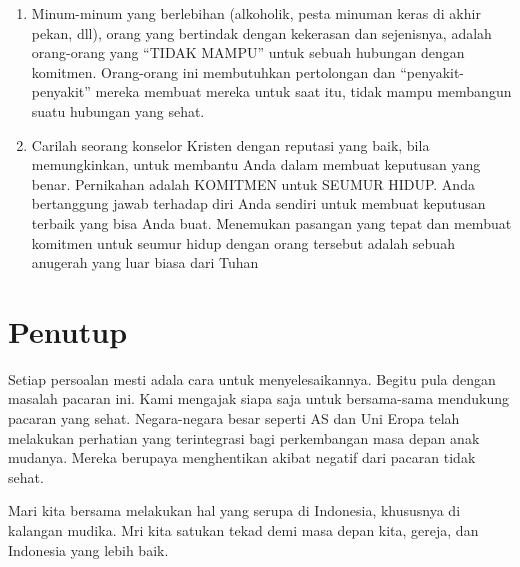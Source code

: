 \documentclass[11pt]{scrartcl}
\begin{document}
\begin{enumerate}
\item Minum-minum yang berlebihan (alkoholik, pesta minuman keras di akhir pekan, dll), orang yang bertindak dengan kekerasan dan sejenisnya, adalah orang-orang yang “TIDAK MAMPU” untuk sebuah hubungan dengan komitmen. Orang-orang ini membutuhkan pertolongan dan “penyakit-penyakit” mereka membuat mereka untuk saat itu, tidak mampu membangun suatu hubungan yang
sehat. 
\item Carilah seorang konselor Kristen dengan reputasi yang baik, bila memungkinkan, untuk membantu Anda dalam membuat keputusan yang benar. Pernikahan adalah KOMITMEN untuk SEUMUR HIDUP. Anda bertanggung jawab terhadap diri Anda sendiri untuk membuat keputusan terbaik yang bisa
Anda buat. Menemukan pasangan yang tepat dan membuat komitmen untuk seumur hidup dengan orang tersebut adalah sebuah anugerah yang luar biasa dari Tuhan
\end{enumerate}

\section*{Penutup}
Setiap persoalan mesti adala cara untuk menyelesaikannya. Begitu pula dengan masalah pacaran ini. Kami mengajak siapa saja untuk bersama-sama mendukung pacaran yang sehat. Negara-negara besar seperti AS dan Uni Eropa telah melakukan perhatian yang terintegrasi bagi perkembangan masa depan anak mudanya. Mereka berupaya menghentikan akibat negatif dari pacaran tidak sehat. 

Mari kita bersama melakukan hal yang serupa di Indonesia, khususnya di kalangan mudika. Mri kita satukan tekad demi masa depan kita, gereja, dan Indonesia yang lebih baik.

\renewcommand{\bibname}{Referensi}
\renewcommand{\refname}{Referensi}
 

\end{document}
